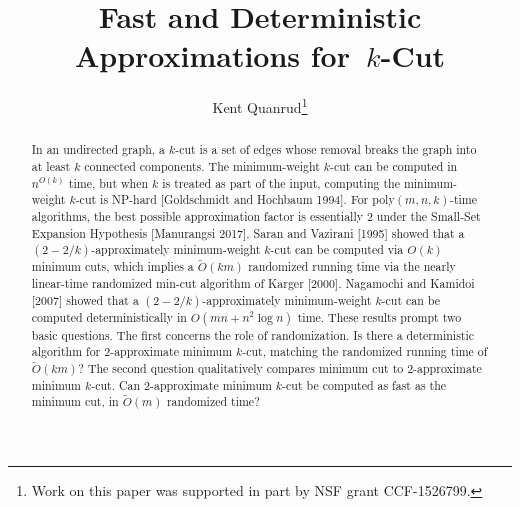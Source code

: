 \documentclass{toc}
\begin{document}
\begin{frontmatter} %




  \title{Fast and Deterministic Approximations for~$k$-Cut}





  \author[quanrud]{Kent Quanrud\thanks{Work on this paper was supported
      in part by NSF grant CCF-1526799.}}






  \begin{abstract}
    In an undirected graph, a $k$-cut is a set of edges whose removal
    breaks the graph into at least $k$ connected components. The
    minimum-weight   %
    $k$-cut can be computed in $n^{O(k)}$ time, but when $k$ is
    treated as part of the input, computing the
    minimum-weight   %
    $k$-cut is
    NP-hard %
    [Goldschmidt and Hochbaum 1994]. For
    poly$({m,n,k})$-time algorithms, the best possible
    approximation factor is essentially 2 under the
    Small-Set Expansion Hypothesis  %
    [Manurangsi 2017]. Saran and Vazirani [1995] showed that a
    $(2 - 2/k)$-approximately
    minimum-weight   %
    $k$-cut can be computed via
    $O(k)$ minimum cuts, which implies a $\tilde{O}(k m)$ randomized running
    time via the nearly %
    linear-time  %
    randomized min-cut algorithm of Karger
    [2000]. Nagamochi and Kamidoi [2007] showed that a
    $(2 - 2/k)$-approximately %
    minimum-weight   %
    $k$-cut can be computed
    deterministically in $O(mn + n^2 \log n)$ time. These results prompt
    two basic questions. The first concerns the role of randomization. Is
    there a deterministic algorithm for $2$-approximate
    minimum  %
    $k$-cut, matching %
    the randomized running time of $\tilde{O}(k m)$?  The second question
    qualitatively compares minimum cut to 2-approximate minimum
    $k$-cut. Can $2$-approximate minimum $k$-cut
    be computed as fast as the
    minimum cut, in %
    $\tilde{O}(m)$ randomized time?


\end{abstract}
\end{frontmatter}
\end{document}

